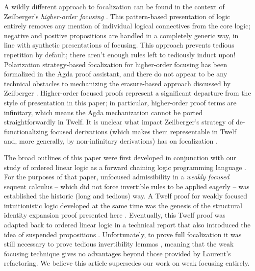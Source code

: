 \documentclass[acmtocl]{robtrans}\pdfoutput=1
\begin{document}
A wildly different approach to focalization can be found in the
context of Zeilberger's {\it higher-order focusing}
\cite{zeilberger08focusing}. This pattern-based presentation of logic
entirely removes any mention of individual logical connectives from
the core logic; negative and positive propositions are handled in a
completely generic way, in line with synthetic presentations of
focusing. This approach prevents tedious repetition by
default; there aren't enough rules left to tediously induct upon!
Polarization strategy-based focalization for higher-order focusing has
been formalized in the Agda proof assistant, and there do not appear
to be any technical obstacles to mechanizing the erasure-based
approach discussed by Zeilberger .
Higher-order focused proofs represent a significant departure from the
style of presentation in this paper; in particular, higher-order proof
terms are infinitary, which means the Agda mechanization cannot be
ported straightforwardly in Twelf. It is unclear what impact
Zeilberger's strategy of de-functionalizing focused derivations (which
makes them representable in Twelf and, more generally, by
non-infinitary derivations) has on focalization
\cite{zeilberger09defunctionalizing}.

The broad outlines of this paper were first developed in conjunction
with our study of ordered linear logic as a forward chaining logic
programming language \cite{pfenning09substructural}. For the purposes
of that paper, unfocused admissibility in a {\it weakly focused}
sequent calculus -- which did not force invertible rules to be applied
eagerly -- was established the historic (long and tedious) way. A
Twelf proof for weakly focused intuitionistic logic developed at the
same time was the genesis of the structural identity expansion proof
presented here \cite{simmons09weak}.  Eventually, this Twelf proof was
adapted back to ordered linear logic in a technical report that also
introduced the idea of suspended propositions
\cite{simmons11weak}. Unfortunately, to prove full focalization it was
still necessary to prove tedious invertibility lemmas
\cite{simmons11logical}, meaning that the weak focusing technique
gives no advantages beyond those provided by Laurent's refactoring. We
believe this article supersedes our work on weak focusing
entirely. 
\end{document}
